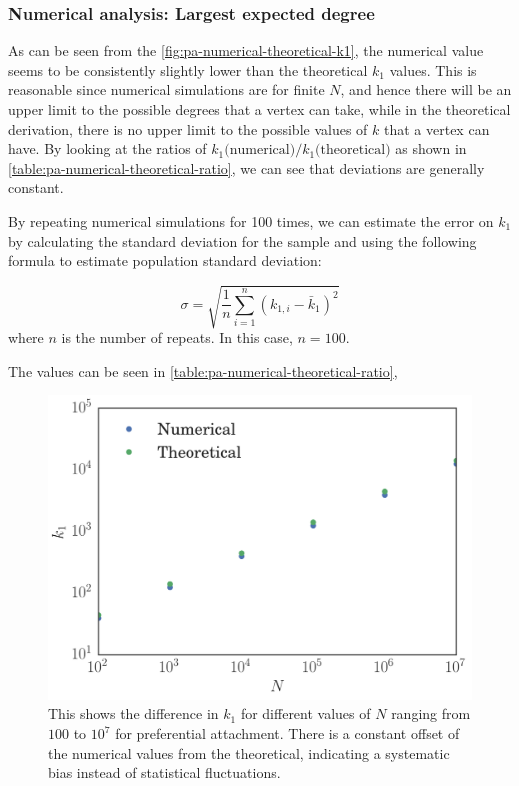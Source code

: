 \subsubsection{Numerical analysis: Largest expected degree}\label{subsection:pa-numerical-largest-degree}

As can be seen from the \autoref{fig:pa-numerical-theoretical-k1}, the numerical value seems to be consistently slightly lower than the theoretical $k_1$ values. This is reasonable since numerical simulations are for finite $N$, and hence there will be an upper limit to the possible degrees that a vertex can take, while in the theoretical derivation, there is no upper limit to the possible values of $k$ that a vertex can have. By looking at the ratios of $ k_1 \text{(numerical)} / k_1 \text{(theoretical)} $ as shown in \autoref{table:pa-numerical-theoretical-ratio}, we can see that deviations are generally constant. 

By repeating numerical simulations for 100 times, we can estimate the error on $k_1$ by calculating the standard deviation for the sample and using the following formula to estimate population standard deviation:

\begin{equation}
	\sigma = \sqrt{\frac{1}{n} \sum_{i=1}^n (k_{1, i} - \bar{k}_1)^2}
	\label{eq:population-std}
\end{equation}
where $n$ is the number of repeats. In this case, $n = 100$. 

The values can be seen in \autoref{table:pa-numerical-theoretical-ratio}, 


\begin{figure}
    \centering
    \includegraphics[height=0.5\linewidth]{img/pa-numerical-theoretical-k1}
    \caption{This shows the difference in $k_1$ for different values of $N$ ranging from $100$ to $10^7$ for preferential attachment. There is a constant offset of the numerical values from the theoretical, indicating a systematic bias instead of statistical fluctuations. }
    \label{fig:pa-numerical-theoretical-k1}
\end{figure}


